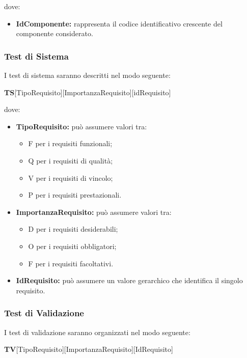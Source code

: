 	dove:
	\begin{itemize}
		\item \textbf{IdComponente:} rappresenta il codice identificativo crescente del componente considerato.
	\end{itemize}
		
		
	\subsubsection{Test di Sistema}
	I test di sistema saranno descritti nel modo seguente: \Spazio
	\centerline{\textbf{TS}[TipoRequisito][ImportanzaRequisito][idRequisito]}
	
	dove:
	\begin{itemize}
		\item \textbf{TipoRequisito:} può assumere valori tra:
		\begin{itemize}
			\item F per i requisiti funzionali;
			\item Q per i requisiti di qualità;
			\item V per i requisiti di vincolo;
			\item P per i requisiti prestazionali.
		\end{itemize}
	
		\item \textbf{ImportanzaRequisito:} può assumere valori tra:
		\begin{itemize}
			\item D per i requisiti desiderabili;
			\item O per i requisiti obbligatori;
			\item F per i requisiti facoltativi.
		\end{itemize}
	
		\item \textbf{IdRequisito:} può assumere un valore gerarchico che identifica il singolo requisito.
	\end{itemize}
	
		
	\subsubsection{Test di Validazione}
	I test di validazione saranno organizzati nel modo seguente:\Spazio
	
    \centerline{\textbf{TV}[TipoRequisito][ImportanzaRequisito][IdRequisito]}

